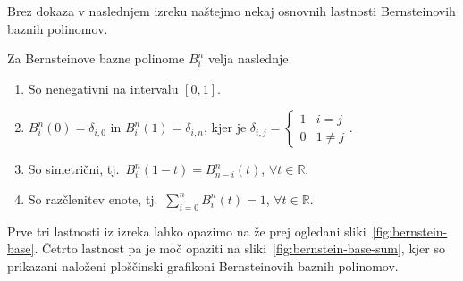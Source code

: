 \documentclass[isrm2, tisk]{fmfdelo}
\newcommand{\R}{\mathbb R}
\newcommand{\bernstein}[2]{\binom{#1}{#2}t^{#2}(1-t)^{#1-#2}}
\begin{document}
    Brez dokaza v naslednjem izreku naštejmo nekaj osnovnih lastnosti Bernsteinovih baznih polinomov.
    \begin{izrek}
        Za Bernsteinove bazne polinome $B_i^n$ velja naslednje.
        \label{izrek:bernsteinovi_lastnosti}
        \begin{enumerate}
            \item So nenegativni na intervalu $[0,1]$.\label{izrek:bernsteinovi_lastnosti:pozitivnost} \label{izrek:bernsteinovi_lastnosti:pozitivnost}
            \item $B_i^n(0) = \delta_{i,0}$ in $B_i^n(1) = \delta_{i,n}$, kjer je $\delta_{i,j} = \begin{cases}
                                                                                                      1 & i=j \\
                                                                                                      0 & 1\neq j
            \end{cases}.$
            \item So simetrični, tj.\ $B_i^n(1-t) = B^n_{n-i}(t)$, $\forall t\in\R$. \label{izrek:bernsteinovi_lastnosti:simetrija}
            \item So razčlenitev enote, tj.\  $\sum_{i=0}^{n}B_{i}^{n}(t) = 1$, $\forall t\in\R$.\label{izrek:bernsteinovi_lastnosti:enota}
        \end{enumerate}
    \end{izrek}
    Prve tri lastnosti iz izreka lahko opazimo na že prej ogledani sliki~\ref{fig:bernstein-base}.
    Četrto lastnost pa je moč opaziti na sliki~\ref{fig:bernstein-base-sum}, kjer so prikazani naloženi ploščinski grafikoni Bernsteinovih baznih polinomov. %
\end{document}
